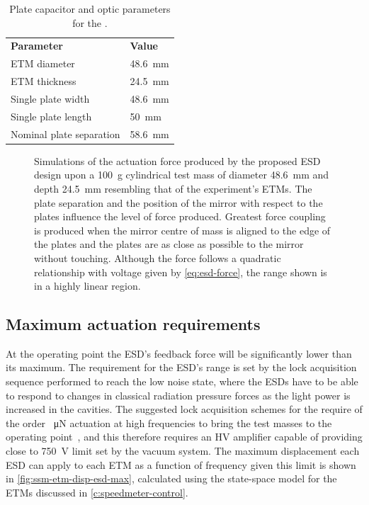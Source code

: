 \begin{table}
  \centering
  \begin{tabular}{ll}
    \textbf{Parameter}   & \textbf{Value} \\
    \gls{ETM} diameter      & \SI{48.6}{\milli\meter} \\
    \gls{ETM} thickness     & \SI{24.5}{\milli\meter} \\
    Single plate width   & \SI{48.6}{\milli\meter} \\
    Single plate length  & \SI{50}{\milli\meter} \\
    Nominal plate separation & \SI{58.6}{\milli\meter} \\
  \end{tabular}
  \caption[Plate capacitor and optic parameters for the \SSMEXPT{}]{\label{tab:ssm-esd-parameters}Plate capacitor and optic parameters for the \SSMEXPT{}.}
\end{table}

\begin{figure}[htp]
  \centering
  
  \caption[Simulations of the actuation force produced by the proposed electrostatic drive design]{\label{fig:ssm-esd-ansys}Simulations of the actuation force produced by the proposed \gls{ESD} design upon a \SI{100}{\gram} cylindrical test mass of diameter \SI{48.6}{\milli\meter} and depth \SI{24.5}{\milli\meter} resembling that of the \SSM{} experiment's \glspl{ETM}. The plate separation and the position of the mirror with respect to the plates influence the level of force produced. Greatest force coupling is produced when the mirror centre of mass is aligned to the edge of the plates and the plates are as close as possible to the mirror without touching. Although the force follows a quadratic relationship with voltage given by \cref{eq:esd-force}, the range shown is in a highly linear region.}
\end{figure}

\subsection{Maximum actuation requirements}
At the operating point the \gls{ESD}'s feedback force will be significantly lower than its maximum. The requirement for the \gls{ESD}'s range is set by the lock acquisition sequence performed to reach the low noise state, where the \glspl{ESD} have to be able to respond to changes in classical radiation pressure forces as the light power is increased in the cavities. The suggested lock acquisition schemes for the \SSMEXPT{} require of the order \SI{}{\micro\newton} actuation at high frequencies to bring the test masses to the operating point~\cite{Glaefke2015}, and this therefore requires an \gls{HV} amplifier capable of providing close to \SI{750}{\volt} limit set by the vacuum system. The maximum displacement each \gls{ESD} can apply to each \gls{ETM} as a function of frequency given this limit is shown in \cref{fig:ssm-etm-disp-esd-max}, calculated using the state-space model for the \glspl{ETM} discussed in \cref{c:speedmeter-control}.

